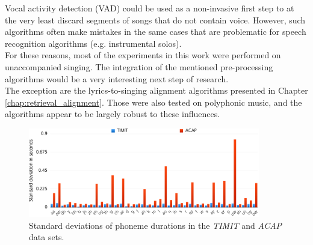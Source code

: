 \begin{description}
 Vocal activity detection (VAD) could be used as a non-invasive first step to at the very least discard segments of songs that do not contain voice. However, such algorithms often make mistakes in the same cases that are problematic for speech recognition algorithms (e.g. instrumental solos)\cite{schlueter2016_ismir}.\\
 For these reasons, most of the experiments in this work were performed on unaccompanied singing. The integration of the mentioned pre-processing algorithms would be a very interesting next step of research.\\
 The exception are the lyrics-to-singing alignment algorithms presented in Chapter \ref{chap:retrieval_alignment}. Those were also tested on polyphonic music, and the algorithms appear to be largely robust to these influences.
 \end{description}

\begin{figure}
	\begin{center}
		\includegraphics[width=0.9\textwidth]{images/phoneme_stats.png}
		\caption{Standard deviations of phoneme durations in the \textit{TIMIT} and \textit{ACAP} data sets.}
		\label{fig:phoneme_stats}
	\end{center}
\end{figure}


